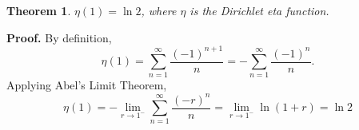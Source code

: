 \documentclass[12pt]{article}
\newtheorem{thm}{Theorem}
\begin{document}
\begin{thm} $\eta(1) = \ln 2$, where $\eta$ is the Dirichlet eta function.
\end{thm}

\textbf{Proof. } By definition,
\[\eta(1) = \sum_{n=1}^{\infty} \frac{(-1)^{n+1}}{n} = -\sum_{n=1}^{\infty} \frac{(-1)^n}{n}.\]
Applying Abel's Limit Theorem, 
\[\eta(1)=-\lim_{r\to 1^-} \sum_{n=1}^{\infty}\frac{(-r)^n}{n} = \lim_{r\to 1^-}\ln(1+r) = \ln 2\]

\end{document}
